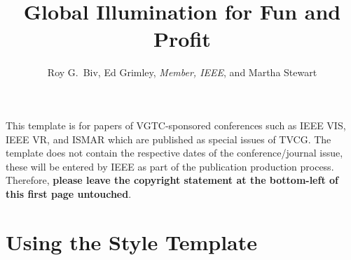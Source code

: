 \documentclass[widereview]{vgtc}             %
\title{Global Illumination for Fun and Profit}
\author{Roy G.\ Biv, Ed Grimley, \textit{Member, IEEE}, and Martha Stewart}
\begin{document}


\maketitle

This template is for papers of VGTC-sponsored conferences such as IEEE VIS, IEEE VR, and ISMAR which are published as special issues of TVCG.
The template does not contain the respective dates of the conference/journal issue, these will be entered by IEEE as part of the publication production process.
Therefore, \textbf{please leave the copyright statement at the bottom-left of this first page untouched}.


\section{Using the Style Template}
\end{document}
